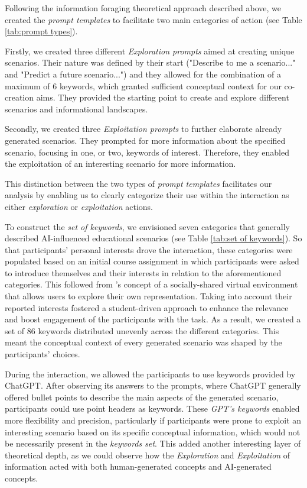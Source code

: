 \documentclass[sn-mathphys, Numbered]{sn-jnl}%
\newcommand\posscite[1]{\citeauthor{#1}'s \parencite*{#1}}
\theoremstyle{thmstyleone}%
\theoremstyle{thmstyletwo}%
\theoremstyle{thmstylethree}%
\begin{document}
Following the information foraging theoretical approach described above, we created the\textit{ prompt templates} to facilitate two main categories of action (see Table \ref{tab:prompt types}).

Firstly, we created three different \textit{Exploration prompts} aimed at creating unique scenarios. Their nature was defined by their start ("Describe to me a scenario..." and "Predict a future scenario...") and they allowed for the combination of a maximum of 6 keywords, which granted sufficient conceptual context for our co-creation aims. They provided the starting point to create and explore different scenarios and informational landscapes.

Secondly, we created three \textit{Exploitation prompts} to further elaborate already generated scenarios. They prompted for more information about the specified scenario, focusing in one, or two, keywords of interest. Therefore, they enabled the exploitation of an interesting scenario for more information.

This distinction between the two types of \textit{prompt templates} facilitates our analysis by enabling us to clearly categorize their use within the interaction as either \textit{exploration} or \textit{exploitation} actions.

To construct the \textit{set of keywords}, we envisioned seven categories that generally described AI-influenced educational scenarios (see Table \ref{tab:set of keywords}). So that participants' personal interests drove the interaction, these categories were populated based on an initial course assignment in which participants were asked to introduce themselves and their interests in relation to the aforementioned categories. This followed from \posscite{niemi_artificial_2023} concept of a socially-shared virtual environment that allows users to explore their own representation. Taking into account their reported interests fostered a student-driven approach to enhance the relevance and boost engagement of the participants with the task. 
As a result, we created a set of 86 keywords distributed unevenly across the different categories. This meant the conceptual context of every generated scenario was shaped by the participants' choices.

During the interaction, we allowed the participants to use keywords provided by ChatGPT. After observing its answers to the prompts, where ChatGPT generally offered bullet points to describe the main aspects of the generated scenario, participants could use point headers as keywords. These \textit{GPT's keywords} enabled more flexibility and precision, particularly if participants were prone to exploit an interesting scenario based on its specific conceptual information, which would not be necessarily present in the \textit{keywords set}. This added another interesting layer of theoretical depth, as we could observe how the \textit{Exploration} and \textit{Exploitation} of information acted with both human-generated concepts and AI-generated concepts.
\end{document}
